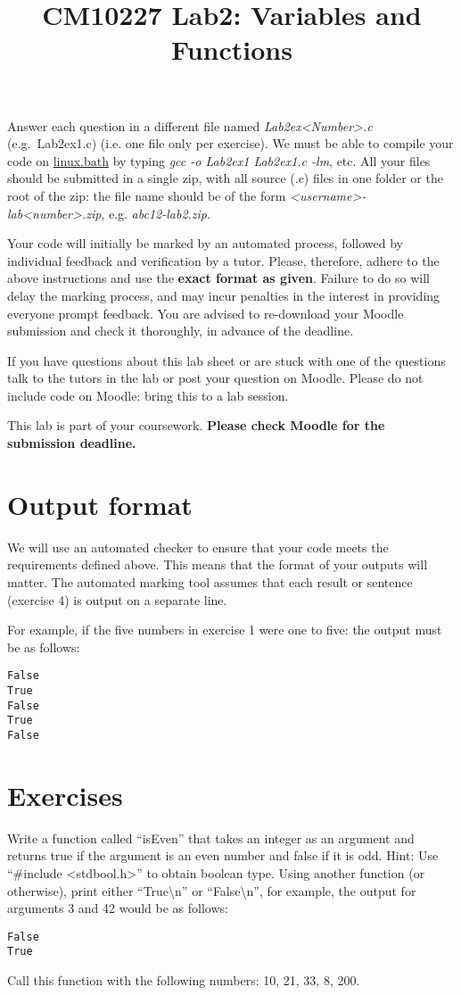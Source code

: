 \documentclass[12pt, a4paper, oneside]{article}
\author{}
\date{}
\title{CM10227 Lab2: Variables and Functions}
\newcounter{qstncntr}
\newcommand{\exerset}{ \vspace*{-11pt}\setcounter{qstncntr}{0} }
\newenvironment{exer}[1]{\vspace*{11pt}\noindent {{\bf Exercise} \stepcounter{qstncntr} \theqstncntr:} #1}{}
\begin{document}
\maketitle

Answer each question in a different file named \emph{Lab2ex<Number>.c }(e.g.\ Lab2ex1.c) (i.e. one file only per exercise).
We must be able to compile your code on \href{http://www.bath.ac.uk/guides/connecting-to-linux-bath/}{linux.bath} by typing \emph{gcc -o Lab2ex1 Lab2ex1.c -lm}, etc.
All your files should be submitted in a single zip, with all source (.c) files in one folder or the root of the zip:
the file name should be of the form \emph{<username>-lab<number>.zip}, e.g. \emph{abc12-lab2.zip}.

Your code will initially be marked by an automated process, followed by individual feedback and verification by a tutor.
Please, therefore, adhere to the above instructions and use the \textbf{exact format as given}.
Failure to do so will delay the marking process, and may incur penalties in the interest in providing everyone prompt feedback.
You are advised to re-download your Moodle submission and check it thoroughly, in advance of the deadline.

If you have questions about this lab sheet or are stuck with one of the questions talk to the tutors in the lab or post your question on Moodle.
Please do not include code on Moodle: bring this to a lab session.

This lab is part of your coursework.
\textbf{Please check Moodle for the submission deadline.}

\section*{Output format}
We will use an automated checker to ensure that your code meets the requirements defined above.
This means that the format of your outputs will matter.
The automated marking tool assumes that each result or sentence (exercise 4) is output on a separate line.

For example, if the five numbers in exercise 1 were one to five: the output must be as follows:
\begin{verbatim}
False
True
False
True
False
\end{verbatim}

\section*{Exercises}
\setlength{\parindent}{0cm} %
\exerset
\begin{exer}
Write a function called ``isEven'' that takes an integer as an argument and returns true if the argument is an even number and false if it is odd. Hint: Use ``\#include <stdbool.h>'' to obtain boolean type.
Using another function (or otherwise), print either ``True\textbackslash n'' or ``False\textbackslash  n'', for example, the output for arguments 3 and 42 would be as follows:
\begin{verbatim}
False
True
\end{verbatim}

Call this function with the following numbers: 10, 21, 33, 8, 200.
\end{exer}
\end{document}
